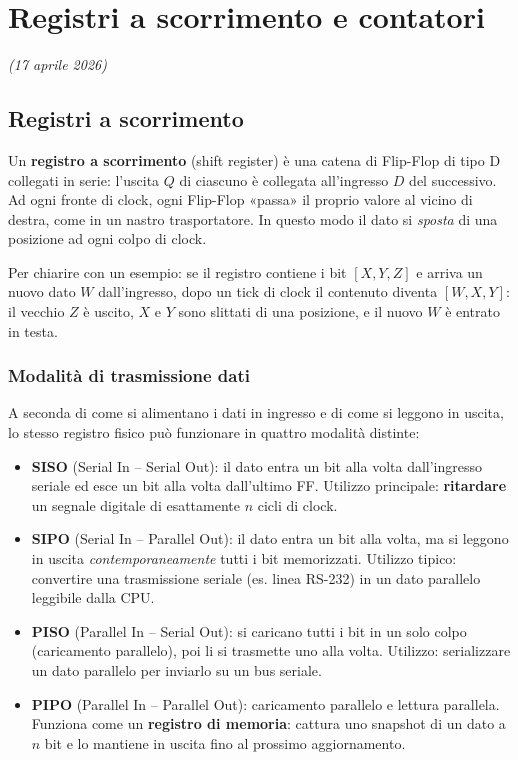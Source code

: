 \chapter{Registri a scorrimento e contatori}
\label{ch:registri-contatori}
\textit{(17 aprile 2026)}

\section{Registri a scorrimento}

Un \textbf{registro a scorrimento} (shift register) è una catena di Flip-Flop di tipo D collegati in serie: l'uscita $Q$ di ciascuno è collegata all'ingresso $D$ del successivo. Ad ogni fronte di clock, ogni Flip-Flop «passa» il proprio valore al vicino di destra, come in un nastro trasportatore. In questo modo il dato si \emph{sposta} di una posizione ad ogni colpo di clock.

\vspace{2mm}
\noindent Per chiarire con un esempio: se il registro contiene i bit $[X, Y, Z]$ e arriva un nuovo dato $W$ dall'ingresso, dopo un tick di clock il contenuto diventa $[W, X, Y]$: il vecchio $Z$ è uscito, $X$ e $Y$ sono slittati di una posizione, e il nuovo $W$ è entrato in testa.

\subsection{Modalità di trasmissione dati}

A seconda di come si alimentano i dati in ingresso e di come si leggono in uscita, lo stesso registro fisico può funzionare in quattro modalità distinte:

\begin{itemize}[leftmargin=1.5em]
    \item \textbf{SISO} (Serial In -- Serial Out): il dato entra un bit alla volta dall'ingresso seriale ed esce un bit alla volta dall'ultimo FF. Utilizzo principale: \textbf{ritardare} un segnale digitale di esattamente $n$ cicli di clock.
    \item \textbf{SIPO} (Serial In -- Parallel Out): il dato entra un bit alla volta, ma si leggono in uscita \emph{contemporaneamente} tutti i bit memorizzati. Utilizzo tipico: convertire una trasmissione seriale (es. linea RS-232) in un dato parallelo leggibile dalla CPU.
    \item \textbf{PISO} (Parallel In -- Serial Out): si caricano tutti i bit in un solo colpo (caricamento parallelo), poi li si trasmette uno alla volta. Utilizzo: serializzare un dato parallelo per inviarlo su un bus seriale.
    \item \textbf{PIPO} (Parallel In -- Parallel Out): caricamento parallelo e lettura parallela. Funziona come un \textbf{registro di memoria}: cattura uno snapshot di un dato a $n$ bit e lo mantiene in uscita fino al prossimo aggiornamento.
\end{itemize}

